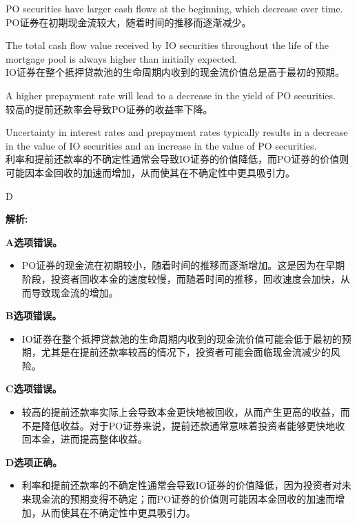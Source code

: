 \documentclass{article}
\newenvironment{explanation}
{\textbf{解析:}\par}
{\par}
\begin{document}
\begin{choices}
    \item PO securities have larger cash flows at the beginning, which decrease over time.\\
    PO证券在初期现金流较大，随着时间的推移而逐渐减少。
    \item The total cash flow value received by IO securities throughout the life of the mortgage pool is always higher than initially expected.\\
    IO证券在整个抵押贷款池的生命周期内收到的现金流价值总是高于最初的预期。
    \item A higher prepayment rate will lead to a decrease in the yield of PO securities.\\
    较高的提前还款率会导致PO证券的收益率下降。
    \item Uncertainty in interest rates and prepayment rates typically results in a decrease in the value of IO securities and an increase in the value of PO securities.\\
    利率和提前还款率的不确定性通常会导致IO证券的价值降低，而PO证券的价值则可能因本金回收的加速而增加，从而使其在不确定性中更具吸引力。
\end{choices}

\begin{correctanswer}
    D
\end{correctanswer}

\begin{explanation}
    \textbf{A选项错误。}
    \begin{itemize}
        \item PO证券的现金流在初期较小，随着时间的推移而逐渐增加。这是因为在早期阶段，投资者回收本金的速度较慢，而随着时间的推移，回收速度会加快，从而导致现金流的增加。
    \end{itemize}

    \textbf{B选项错误。}
    \begin{itemize}
        \item IO证券在整个抵押贷款池的生命周期内收到的现金流价值可能会低于最初的预期，尤其是在提前还款率较高的情况下，投资者可能会面临现金流减少的风险。
    \end{itemize}

    \textbf{C选项错误。}
    \begin{itemize}
        \item 较高的提前还款率实际上会导致本金更快地被回收，从而产生更高的收益，而不是降低收益。对于PO证券来说，提前还款通常意味着投资者能够更快地收回本金，进而提高整体收益。
    \end{itemize}

    \textbf{D选项正确。}
    \begin{itemize}
        \item 利率和提前还款率的不确定性通常会导致IO证券的价值降低，因为投资者对未来现金流的预期变得不确定；而PO证券的价值则可能因本金回收的加速而增加，从而使其在不确定性中更具吸引力。
    \end{itemize}
\end{explanation}
\end{document}
